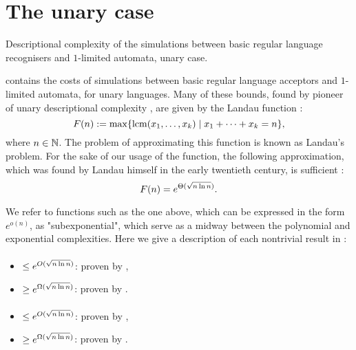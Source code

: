 \section{The unary case}\label{sec:sims-unary}

\begin{table}
	\centering
	\caption{Descriptional complexity of the simulations between basic regular language recognisers and $1$-limited automata, unary case.}
	\label{tab:sims-1la-unary}
\end{table}

 contains the costs of simulations between basic regular language acceptors and $1$-limited automata, for unary languages.
Many of these bounds, found by pioneer of unary descriptional complexity , are given by the Landau function \cite{Chr86}:
\begin{equation}
	F(n) := \max\{\operatorname{lcm}(x_1,\dots,x_k)\mid x_1+\dots+x_k=n\} \text,
\end{equation}
where $n\in\mathbb N$.
The problem of approximating this function is known as Landau's problem.
For the sake of our usage of the function, the following approximation, which was found by Landau himself in the early twentieth century, is sufficient \cite{Lan03,Lan09}:
\begin{equation}
	F(n) = e^{\Theta(\sqrt{n\ln n})} \text.
\end{equation}

We refer to functions such as the one above, which can be expressed in the form $e^{o(n)}$, as "subexponential", which serve as a midway between the polynomial and exponential complexities.
Here we give a description of each nontrivial result in :

\paragraph{\ONFA{}\tto\ODFA}
\begin{itemize}
	\item $\le e^{O(\sqrt{n\ln n})}$: proven by ,
	\item $\ge e^{\Omega(\sqrt{n\ln n})}$: proven by .
\end{itemize}
\paragraph{\TDFA{}\tto\ODFA}\label{cost:2DFAto1DFAu}
\begin{itemize}
	\item $\le e^{O(\sqrt{n\ln n})}$: proven by ,
	\item $\ge e^{\Omega(\sqrt{n\ln n})}$: proven by .
\end{itemize}
